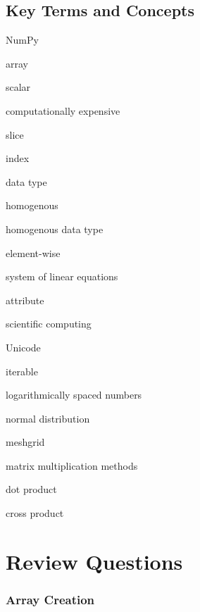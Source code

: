 \documentclass{book}
\newenvironment{key_terms}{\begin{multicols}{3}}{\end{multicols}} %
\begin{document}
    
        \subsection{Key Terms and Concepts}\label{key-terms-and-concepts}
    




    
        \begin{key_terms}
        NumPy

array

scalar

computationally expensive

slice

index

data type

homogenous

homogenous data type

element-wise

system of linear equations

attribute

scientific computing

Unicode

iterable

logarithmically spaced numbers

normal distribution

meshgrid

matrix multiplication methods

dot product

cross product
        \end{key_terms}

    




    
        \section{Review Questions}\label{review-questions}
    




    
        \subsubsection{Array Creation}\label{array-creation}
    
\end{document}
